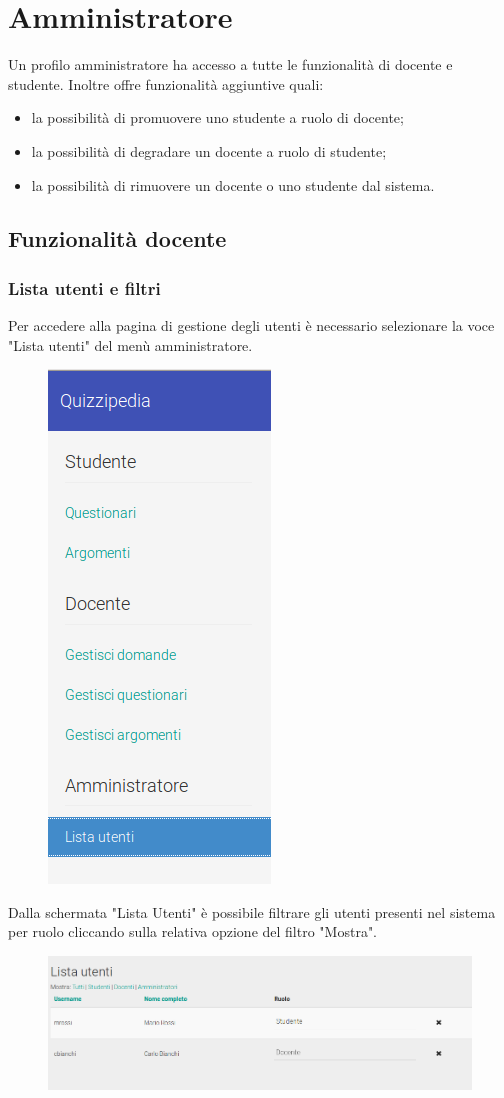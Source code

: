 \documentclass[12pt,a4paper]{article}
\begin{document}
		\section{Amministratore}
		Un profilo amministratore ha accesso a tutte le funzionalità di docente e studente.
		Inoltre offre funzionalità aggiuntive quali:
		\begin{itemize}
			\item la possibilità di promuovere uno studente a ruolo di docente;
			\item la possibilità di degradare un docente a ruolo di studente;
			\item la possibilità di rimuovere un docente o uno studente dal sistema.
		\end{itemize}
		\subsection{Funzionalità docente}
		
		\subsubsection{Lista utenti e filtri}
		Per accedere alla pagina di gestione degli utenti è necessario selezionare la voce "Lista utenti" del menù amministratore.
		\begin{figure}[H]
			\centering
			\includegraphics[width=0.2\linewidth]{../img/screenshot/usersListMenu.png}
			\caption{}
			\label{Lista utenti}
		\end{figure}
        Dalla schermata "Lista Utenti" è possibile filtrare gli utenti presenti nel sistema per ruolo cliccando sulla relativa opzione del filtro "Mostra".
		\begin{figure}[H]
			
			\centering
			\includegraphics[width=1.0\linewidth]{../img/screenshot/usersListCrop.png}
			\caption{}
			\label{Lista utenti}
		\end{figure}
	
\end{document}
